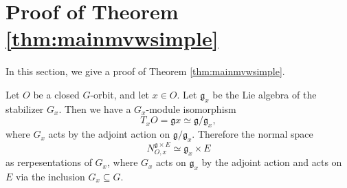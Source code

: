 \documentclass[12pt]{amsart}
\newtheorem{theorem}[lm]{Theorem}
\theoremstyle{definition}
\theoremstyle{remark}\newtheorem{rmk}[lm]{Remark}
\newcommand{\RO}{{\mathrm {O}}}
\newcommand{\GL}{{\mathrm{GL}}}
\newcommand{\Sp}{{\mathrm{Sp}}}
\newcommand{\g}{\mathfrak g}
\newcommand{\C}{\mathbb{F}}
\begin{document}
	
	
		
		
		

	\section{Proof of Theorem \ref{thm:mainmvwsimple}}\label{sec:6}
    In this section, we give a proof of Theorem \ref{thm:mainmvwsimple}.

    Let $O$ be a closed $G$-orbit, and let $x\in O$. Let $\g_x$ be the Lie algebra of the stabilizer $G_x$. Then we have a $G_x$-module isomorphism
	\begin{equation*}
		T_xO=\g x\simeq\g/\g_x,
	\end{equation*}
	where $G_x$ acts by the adjoint action on $\g/\g_x$. Therefore the normal space
	\begin{equation}
		\label{eq:descent1}
		N_{O,x}^{\g\times E}\simeq\g_x\times E
	\end{equation}
	as rerpesentations of $G_x$, where $G_x$ acts on $\g_x$ by the adjoint action and acts on $E$ via the inclusion $G_x\subseteq G$.
	
\end{document}
